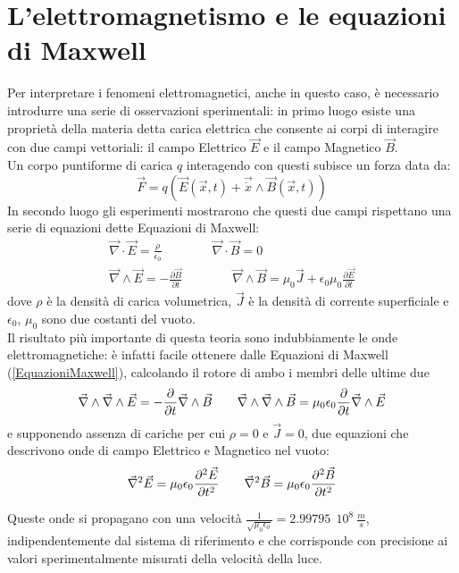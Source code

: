 \section{L'elettromagnetismo e le equazioni di Maxwell}
Per interpretare i fenomeni elettromagnetici, anche in questo caso, è necessario introdurre
una serie di osservazioni sperimentali: in primo luogo esiste una proprietà della materia 
detta carica elettrica che consente ai corpi di interagire con due campi vettoriali: 
il campo Elettrico $\vec{E}$ e il campo Magnetico $\vec{B}$.\\ Un corpo puntiforme di carica 
$q$ interagendo con questi subisce un forza data da:
\begin{equation}
	\vec{F}=q(\vec{E}(\vec{x},t)+\vec{\dot{x}}\wedge\vec{B}(\vec{x},t))
	\label{ForzaLorentz}
\end{equation}
In secondo luogo gli esperimenti mostrarono che questi due campi rispettano una serie di equazioni 
dette Equazioni di Maxwell:
\begin{equation}
	\begin{gathered}
		\vec{\nabla}\cdot\vec{E}=\frac{\rho}{\epsilon_0} \qquad \qquad \vec{\nabla}\cdot\vec{B}=0 \\
		\vec{\nabla}\wedge\vec{E}=-\frac{\partial\vec{B}}{\partial t} \qquad \qquad \vec{\nabla}\wedge
		\vec{B}=\mu_0\vec{J}+\epsilon_0\mu_0\frac{\partial\vec{E}}{\partial t}
		\label{EquazioniMaxwell}
	\end{gathered}
\end{equation}
dove $\rho$ è la densità di carica volumetrica, $\vec{J}$ è la densità di corrente superficiale e 
$\epsilon_0$, $\mu_0$ sono due costanti del vuoto.\\

Il risultato più importante di questa teoria sono indubbiamente le onde elettromagnetiche: è infatti 
facile ottenere dalle Equazioni di Maxwell (\ref{EquazioniMaxwell}), calcolando il rotore di ambo 
i membri delle ultime due
\begin{equation*}
	\vec{\nabla}\wedge\vec{\nabla}\wedge\vec{E}=-\frac{\partial}{\partial t}\vec{\nabla}\wedge\vec{B} 
	\qquad \vec{\nabla}\wedge\vec{\nabla}\wedge\vec{B}=\mu_0\epsilon_0\frac{\partial}{\partial t}
	\vec{\nabla}\wedge\vec{E}
\end{equation*}
e supponendo assenza di cariche per cui $\rho=0$ e $\vec{J}=0$, due equazioni che descrivono 
onde di campo Elettrico e Magnetico nel vuoto:
\begin{equation}
	\vec{\nabla}^2\vec{E}=\mu_0\epsilon_0\frac{\partial^2\vec{E}}{\partial t^2} \qquad \vec{\nabla}^2\vec{B}=
	\mu_0\epsilon_0\frac{\partial^2\vec{B}}{\partial t^2}
\end{equation}

Queste onde si propagano con una velocità $\frac{1}{\sqrt{\mu_0\epsilon_0}}=2.99795\ \ 10^8\  \frac{m}{s}$, 
indipendentemente dal sistema di riferimento e che corrisponde con precisione ai valori
 sperimentalmente misurati della velocità della luce.  